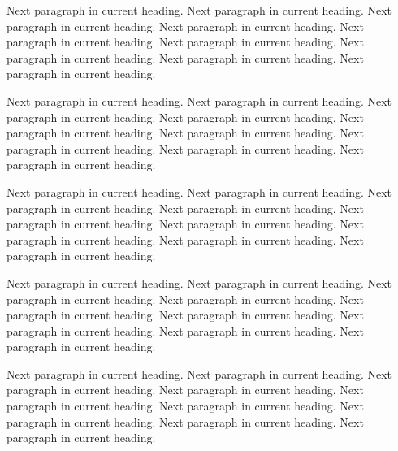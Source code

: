 Next paragraph in current heading. Next paragraph in current heading.
Next paragraph in current heading. Next paragraph in current heading.
Next paragraph in current heading. Next paragraph in current heading.
Next paragraph in current heading. Next paragraph in current heading.
Next paragraph in current heading.

Next paragraph in current heading. Next paragraph in current heading.
Next paragraph in current heading. Next paragraph in current heading.
Next paragraph in current heading. Next paragraph in current heading.
Next paragraph in current heading. Next paragraph in current heading.
Next paragraph in current heading.

Next paragraph in current heading. Next paragraph in current heading.
Next paragraph in current heading. Next paragraph in current heading.
Next paragraph in current heading. Next paragraph in current heading.
Next paragraph in current heading. Next paragraph in current heading.
Next paragraph in current heading.


Next paragraph in current heading. Next paragraph in current heading.
Next paragraph in current heading. Next paragraph in current heading.
Next paragraph in current heading. Next paragraph in current heading.
Next paragraph in current heading. Next paragraph in current heading.
Next paragraph in current heading.

Next paragraph in current heading. Next paragraph in current heading.
Next paragraph in current heading. Next paragraph in current heading.
Next paragraph in current heading. Next paragraph in current heading.
Next paragraph in current heading. Next paragraph in current heading.
Next paragraph in current heading.

%
%

